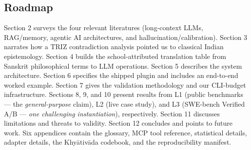 \subsection{Roadmap}\label{roadmap}

Section 2 surveys the four relevant literatures (long-context LLMs, RAG/memory, agentic AI architectures, and hallucination/calibration). Section 3 narrates how a TRIZ contradiction analysis pointed us to classical Indian epistemology. Section 4 builds the school-attributed translation table from Sanskrit philosophical terms to LLM operations. Section 5 describes the system architecture. Section 6 specifies the shipped plugin and includes an end-to-end worked example. Section 7 gives the validation methodology and our CLI-budget infrastructure. Sections 8, 9, and 10 present results from L1 (public benchmarks --- the \emph{general-purpose} claim), L2 (live case study), and L3 (SWE-bench Verified A/B --- \emph{one challenging instantiation}), respectively. Section 11 discusses limitations and threats to validity. Section 12 concludes and points to future work. Six appendices contain the glossary, MCP tool reference, statistical details, adapter details, the Khyātivāda codebook, and the reproducibility manifest.

